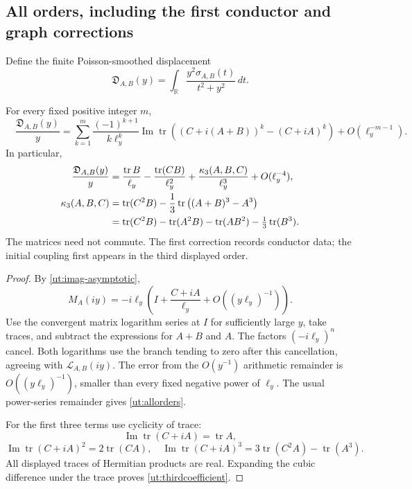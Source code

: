 \subsection{All orders, including the first conductor and graph corrections}

Define the finite Poisson-smoothed displacement
\[
 \mathfrak D_{A,B}(y)
       =\int_{\mathbb R}\frac{y^2\sigma_{A,B}(t)}{t^2+y^2}\,dt.
\]

\begin{theorem}\label{ut:expansion}
For every fixed positive integer $m$,
\begin{equation}\label{ut:allorders}
 \boxed{\quad
 \frac{\mathfrak D_{A,B}(y)}y
   =\sum_{k=1}^{m}\frac{(-1)^{k+1}}{k\ell_y^k}
        \operatorname{Im}\operatorname{tr}
        \left((C+i(A+B))^k-(C+iA)^k\right)
        +O(\ell_y^{-m-1}).\quad}
\end{equation}
In particular,
\begin{align}
 \frac{\mathfrak D_{A,B}(y)}y
  &=\frac{\operatorname{tr}B}{\ell_y}
       -\frac{\operatorname{tr}(CB)}{\ell_y^2}
       +\frac{\kappa_3(A,B,C)}{\ell_y^3}
       +O(\ell_y^{-4}),\label{ut:threeorders}\\
 \kappa_3(A,B,C)
  &=\operatorname{tr}(C^2B)
       -\frac13\operatorname{tr}\left((A+B)^3-A^3\right)\notag\\
  &=\operatorname{tr}(C^2B)-\operatorname{tr}(A^2B)
       -\operatorname{tr}(AB^2)-\tfrac13\operatorname{tr}(B^3).
       \label{ut:thirdcoefficient}
\end{align}
The matrices need not commute. The first correction records conductor
data; the initial coupling first appears in the third displayed order.
\end{theorem}

\begin{proof}
By \eqref{ut:imag-asymptotic},
\[
 M_A(iy)=-i\ell_y\left(I+\frac{C+iA}{\ell_y}
                                      +O((y\ell_y)^{-1})\right).
\]
Use the convergent matrix logarithm series at $I$ for sufficiently large
$y$, take traces, and subtract the expressions for $A+B$ and $A$.
The factors $(-i\ell_y)^n$ cancel. Both logarithms use the branch tending
to zero after this cancellation, agreeing with $\mathcal L_{A,B}(iy)$.
The error from the $O(y^{-1})$ arithmetic remainder is
$O((y\ell_y)^{-1})$, smaller than every fixed negative power of $\ell_y$.
The usual power-series remainder gives \eqref{ut:allorders}.

For the first three terms use cyclicity of trace:
\[
 \operatorname{Im}\operatorname{tr}(C+iA)=\operatorname{tr}A,
\]
\[
 \operatorname{Im}\operatorname{tr}(C+iA)^2=2\operatorname{tr}(CA),
 \quad
 \operatorname{Im}\operatorname{tr}(C+iA)^3
             =3\operatorname{tr}(C^2A)-\operatorname{tr}(A^3).
\]
All displayed traces of Hermitian products are real. Expanding the cubic
difference under the trace proves \eqref{ut:thirdcoefficient}.
\end{proof}

